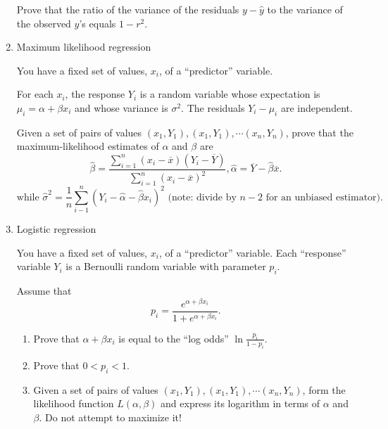 \documentclass[12pt]{article}
\begin{document}
\begin{enumerate}
\vspace{160pt}

Prove that the ratio of the variance of the residuals $y - \hat{y}$ to the variance of the observed $y$'s equals $1-r^2$.


\pagebreak


\item Maximum likelihood regression

You have a fixed set of values, $x_i$, of a ``predictor'' variable.

For each $x_i$, the response $Y_i$ is a random variable whose expectation is $\mu_i = \alpha + \beta x_i$ and whose variance is $\sigma^2$. The residuals $Y_i-\mu_i$ are independent.

Given a set of pairs of values $(x_1, Y_1), (x_1, Y_1), \cdots (x_n, Y_n)$, prove that the maximum-likelihood estimates of $\alpha$ and $\beta$ are
$$\hat{\beta} = \frac{\sum_{i=1}^n(x_i - \overline{x})(Y_i - \overline{Y})} {\sum_{i=1}^n(x_i - \overline{x})^2}, \hat{ \alpha} =\overline{Y} - \hat{\beta} \overline{x}.$$
$$\text{while } \hat{\sigma}^2 = \frac{1}{n} \sum_{i-1}^n(Y_i - \hat{\alpha} - \hat{\beta}x_i)^2\text{ (note: divide by } n-2 \text{ for an unbiased estimator)}.$$

\pagebreak


\item Logistic regression

You have a fixed set of values, $x_i$, of a ``predictor'' variable. Each ``response'' variable $Y_i$ is a Bernoulli random variable with parameter $p_i.$

Assume that $$p_i = \frac{e^{\alpha + \beta x_i}}{1 + e^{\alpha + \beta x_i}}.$$

\begin{enumerate}

\item Prove that $\alpha + \beta x_i$ is equal to the ``log odds'' $\ln{\frac{p_i} {1 - p_i}}$.

\item Prove that $0 < p_i <1$.

\item Given a set of pairs of values $(x_1, Y_1), (x_1, Y_1), \cdots (x_n, Y_n)$, form the likelihood function $L(\alpha, \beta)$ and express its logarithm in terms of $\alpha$ and $\beta$. Do not attempt to maximize it!

\end{enumerate}






\end{enumerate}
\end{document}
